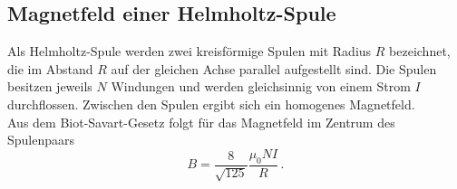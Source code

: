 
\subsection{Magnetfeld einer Helmholtz-Spule}
Als Helmholtz-Spule werden zwei kreisförmige Spulen mit Radius $R$ bezeichnet, die im Abstand $R$ auf der gleichen Achse parallel aufgestellt sind.
Die Spulen besitzen jeweils $N$ Windungen und werden gleichsinnig von einem Strom $I$ durchflossen.
Zwischen den Spulen ergibt sich ein homogenes Magnetfeld.
\\
Aus dem Biot-Savart-Gesetz folgt für das Magnetfeld im Zentrum des Spulenpaars
\begin{equation}
    B = \frac{8}{\sqrt{125}} \frac{\mu_0 N I}{R} \, .
    \label{eqn:helmholtz}
\end{equation}